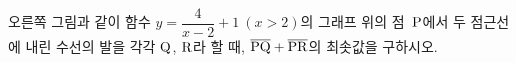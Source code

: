 \hspace*{2mm}\begin{minipage}[t]{\dimexpr\linewidth-2mm\relax}\vspace{0pt}
\noindent\begin{minipage}[t]{0.58\linewidth}\vspace{0pt}\raggedright 오른쪽 그림과 같이 함수 $y=\dfrac{4}{x-2}+1\ (x>2)$의 그래프 위의 점~$\mathrm{P}$에서 두 점근선에 내린 수선의 발을 각각 $\mathrm{Q}$, $\mathrm{R}$라 할 때, $\overline{\mathrm{PQ}}+\overline{\mathrm{PR}}$의 최솟값을 구하시오.\end{minipage}\hfill\begin{minipage}[t]{0.4\linewidth}\vspace{0pt}\centering \resizebox{\ifdim\width>\linewidth\linewidth\else\width\fi}{!}{}\end{minipage}\par\end{minipage}
